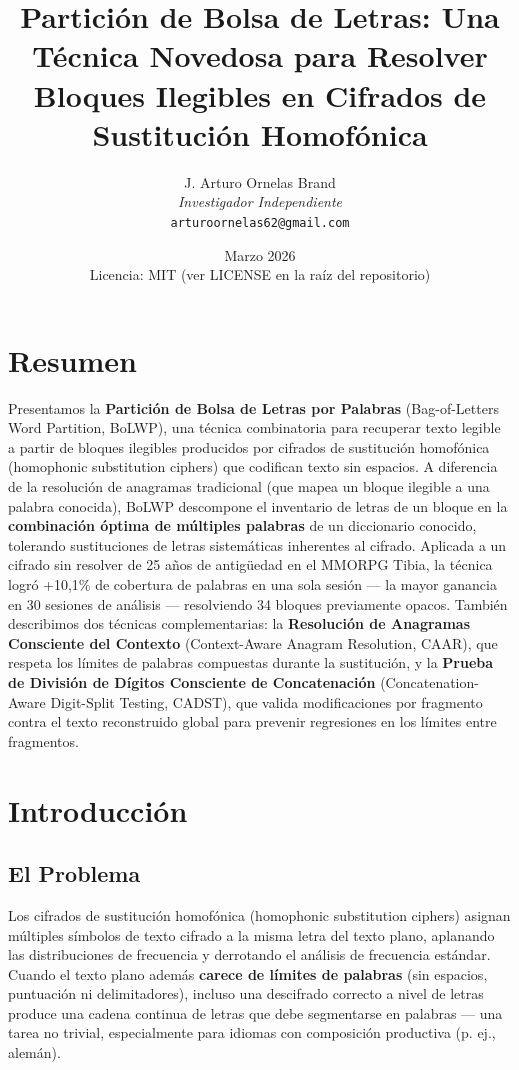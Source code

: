 \documentclass[11pt,a4paper]{article}
\title{Partición de Bolsa de Letras: Una Técnica Novedosa para Resolver Bloques Ilegibles en Cifrados de Sustitución Homofónica}
\author{
    J. Arturo Ornelas Brand \\
    \textit{Investigador Independiente} \\
    \texttt{arturoornelas62@gmail.com}
}
\date{Marzo 2026\\[0.5em]\normalsize Licencia: MIT (ver LICENSE en la ra\'{i}z del repositorio)}
\begin{document}
\maketitle
\tableofcontents
\newpage

\section{Resumen}

Presentamos la \textbf{Partición de Bolsa de Letras por Palabras} (Bag-of-Letters Word Partition, BoLWP), una técnica combinatoria para recuperar texto legible a partir de bloques ilegibles producidos por cifrados de sustitución homofónica (homophonic substitution ciphers) que codifican texto sin espacios. A diferencia de la resolución de anagramas tradicional (que mapea un bloque ilegible a una palabra conocida), BoLWP descompone el inventario de letras de un bloque en la \textbf{combinación óptima de múltiples palabras} de un diccionario conocido, tolerando sustituciones de letras sistemáticas inherentes al cifrado. Aplicada a un cifrado sin resolver de 25 años de antigüedad en el MMORPG Tibia, la técnica logró +10,1\% de cobertura de palabras en una sola sesión --- la mayor ganancia en 30 sesiones de análisis --- resolviendo 34 bloques previamente opacos. También describimos dos técnicas complementarias: la \textbf{Resolución de Anagramas Consciente del Contexto} (Context-Aware Anagram Resolution, CAAR), que respeta los límites de palabras compuestas durante la sustitución, y la \textbf{Prueba de División de Dígitos Consciente de Concatenación} (Concatenation-Aware Digit-Split Testing, CADST), que valida modificaciones por fragmento contra el texto reconstruido global para prevenir regresiones en los límites entre fragmentos.

\section{Introducción}

\subsection{El Problema}

Los cifrados de sustitución homofónica (homophonic substitution ciphers) asignan múltiples símbolos de texto cifrado a la misma letra del texto plano, aplanando las distribuciones de frecuencia y derrotando el análisis de frecuencia estándar. Cuando el texto plano además \textbf{carece de límites de palabras} (sin espacios, puntuación ni delimitadores), incluso una descifrado correcto a nivel de letras produce una cadena continua de letras que debe segmentarse en palabras --- una tarea no trivial, especialmente para idiomas con composición productiva (p. ej., alemán).
\end{document}
